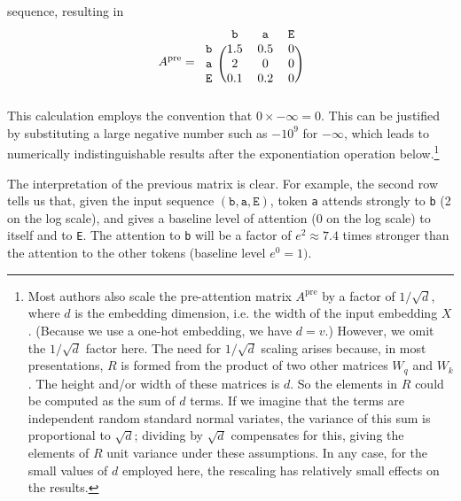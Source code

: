 \documentclass{article}
\newcommand{\ta}{\mathtt{a}}
\newcommand{\tb}{\mathtt{b}}
\newcommand{\tE}{\mathtt{E}}
\begin{document}
sequence, resulting in
\begin{displaymath}
  A^\text{pre} =
  \begin{blockarray}{cccc}
       & \tb & \ta & \tE   \\
      \begin{block}{c(ccc)}
        \tb & 1.5 & 0.5 & 0  \\
        \ta & 2 & 0 & 0  \\
        \tE & 0.1 & 0.2 & 0  \\
      \end{block}
  \end{blockarray}
\end{displaymath}
This calculation employs the convention that $0 \times -\infty =
0$. This can be justified by substituting a large negative number such
as $-10^9$ for $-\infty$, which leads to numerically indistinguishable
results after the exponentiation operation below.\footnote{Most
  authors also scale the pre-attention matrix $A^\text{pre}$ by a
  factor of $1/\sqrt{d}$, where $d$ is the embedding dimension,
  i.e. the width of the input embedding $X$. (Because we use a one-hot
  embedding, we have $d=v$.) However, we omit the $1/\sqrt{d}$ factor
  here.  The need for $1/\sqrt{d}$ scaling arises because, in most
  presentations, $R$ is formed from the product of two other matrices
  $W_q$ and $W_k$. The height and/or width of these matrices is
  $d$. So the elements in $R$ could be computed as the sum of $d$
  terms. If we imagine that the terms are independent random standard
  normal variates, the variance of this sum is proportional to
  $\sqrt{d}$; dividing by $\sqrt{d}$ compensates for this, giving the
  elements of $R$ unit variance under these assumptions. In any case,
  for the small values of $d$ employed here, the rescaling has
  relatively small effects on the results.}

The interpretation of the previous matrix is clear. For example, the
second row tells us that, given the input sequence $(\tb, \ta, \tE)$,
token \texttt{a} attends strongly to \texttt{b} (2 on the log scale),
and gives a baseline level of attention (0 on the log scale) to itself
and to \texttt{E}. The attention to \texttt{b} will be a factor of
$e^2\approx 7.4$ times stronger than the attention to the other tokens
(baseline level $e^0=1)$.
\end{document}
